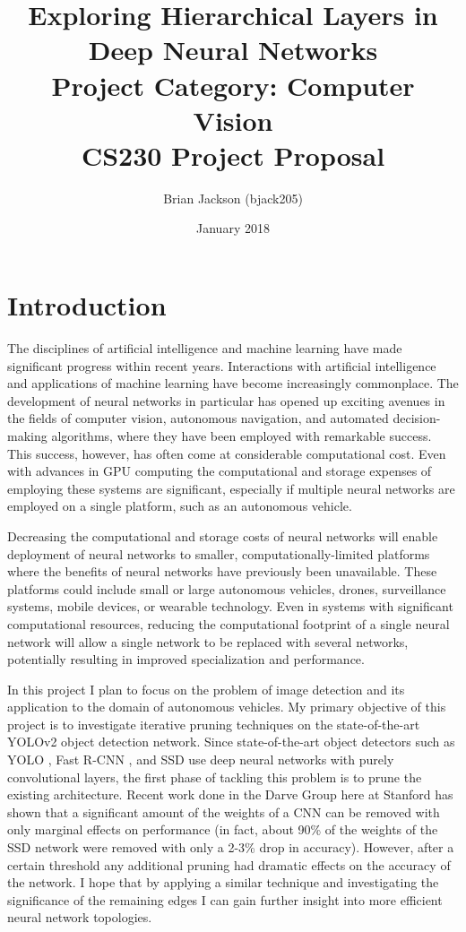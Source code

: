 \documentclass[10pt,letterpaper]{article}
\title{Exploring Hierarchical Layers in Deep Neural Networks \\
	\large Project Category: Computer Vision \\ 
	CS230 Project Proposal\\
	}
\author{Brian Jackson (bjack205)}
\date{January 2018}
\begin{document}
	\maketitle
	
	\section{Introduction}
	The disciplines of artificial intelligence and machine learning have made significant progress within recent years. Interactions with artificial intelligence and applications of machine learning have become increasingly commonplace. The development of neural networks in particular has opened up exciting avenues in the fields of computer vision, autonomous navigation, and automated decision-making algorithms, where they have been employed with remarkable success. This success, however, has often come at considerable computational cost. Even with advances in GPU computing the computational and storage expenses of employing these systems are significant, especially if multiple neural networks are employed on a single platform, such as an autonomous vehicle. 
	
	Decreasing the computational and storage costs of neural networks will enable deployment of neural networks to smaller, computationally-limited platforms where the benefits of neural networks have previously been unavailable. These platforms could include small or large autonomous vehicles, drones, surveillance systems, mobile devices, or wearable technology. Even in systems with significant computational resources, reducing the computational footprint of a single neural network will allow a single network to be replaced with several networks, potentially resulting in improved specialization and performance.
	
	In this project I plan to focus on the problem of image detection and its application to the domain of autonomous vehicles. My primary objective of this project is to investigate iterative pruning techniques on the state-of-the-art YOLOv2 object detection network. Since state-of-the-art object detectors such as YOLO \cite{Redmon2015,Redmon2016}, Fast R-CNN \cite{Girshick2015}, and SSD \cite{Liu2016} use deep neural networks with purely convolutional layers, the first phase of tackling this problem is to prune the existing architecture. Recent work done in the Darve Group here at Stanford has shown that a significant amount of the weights of a CNN can be removed with only marginal effects on performance (in fact, about 90\% of the weights of the SSD network were removed with only a 2-3\% drop in accuracy). However, after a certain threshold any additional pruning had dramatic effects on the accuracy of the network. I hope that by applying a similar technique and investigating the significance of the remaining edges I can gain further insight into more efficient neural network topologies. 
	
\end{document}
